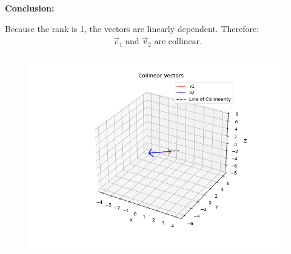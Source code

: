 \documentclass[journal]{IEEEtran}
\begin{document}
\textbf{Conclusion:}

Because the rank is 1, the vectors are linearly dependent. Therefore:
\begin{align}
\vec{v}_1 \text{ and } \vec{v}_2 \text{ are collinear.}
\end{align}


\begin{figure}
    \centering
    \includegraphics[width=0.8\columnwidth]{figs/fig1.png}
    \caption{}
    \label{fig:placeholder}
\end{figure}
\end{document}
